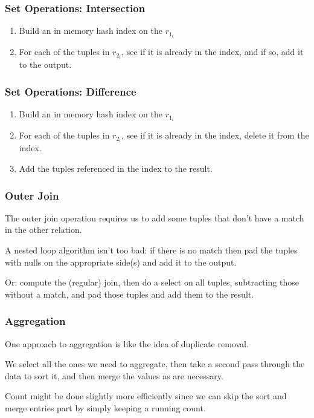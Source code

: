 \begin{frame}
\frametitle{Set Operations: Intersection}
\begin{enumerate}
		\item Build an in memory hash index on the $r_{1_{i}}$
		\item For each of the tuples in $r_{2_{i}}$, see if it is already in the index, and if so, add it to the output.
	\end{enumerate}

\end{frame}

\begin{frame}
\frametitle{Set Operations: Difference}
\begin{enumerate}
		\item Build an in memory hash index on the $r_{1_{i}}$
		\item For each of the tuples in $r_{2_{i}}$, see if it is already in the index, delete it from the index.
		\item Add the tuples referenced in the index to the result.
	\end{enumerate}

\end{frame}

\begin{frame}
\frametitle{Outer Join}

The outer join operation requires us to add some tuples that don't have a match in the other relation. 

A nested loop algorithm isn't too bad: if there is no match then pad the tuples with nulls on the appropriate side(s) and add it to the output.

Or: compute the (regular) join, then do a select on all tuples, subtracting those without a match, and pad those tuples and add them to the result.


\end{frame}

\begin{frame}
\frametitle{Aggregation}

One approach to aggregation is like the idea of duplicate removal. 

We select all the ones we need to aggregate, then take a second pass through the data to sort it, and then merge the values as are necessary.

Count might be done slightly more efficiently since we can skip the sort and merge entries part by simply keeping a running count. 

\end{frame}


